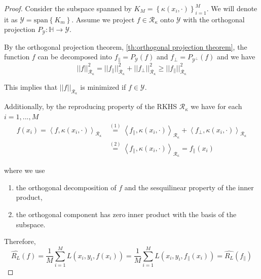 \begin{proof}
    Consider the subspace spanned by $K_M =\left \lbrace \kappa(x_i, \cdot) \right\rbrace_{i = 1}^{M}$. We will denote it as $\mathcal{Y}=\mathrm{span}\left\lbrace K_m \right\rbrace$. Assume we project $f \in \mathcal{R}_{\kappa}$ onto $\mathcal{Y}$ with the orthogonal projection ${P_{\mathcal{Y}}: \mathbb{H} \longrightarrow \mathcal{Y}}$.

    By the orthogonal projection theorem, \autoref{th:orthogonal projection theorem}, the function $f$ can be decomposed into $f_{\parallel} = P_{\mathcal{Y}}(f)$ and $f_{\perp} = P_{\mathcal{Y}^{\perp}}(f)$ and we have 
    \begin{equation}\label{eq:inequality orthogonal projection}
        ||f||_{\mathcal{R}_{\kappa}}^2 = ||f_{\parallel}||_{\mathcal{R}_{\kappa}}^2 + ||f_{\perp}||_{\mathcal{R}_{\kappa}}^2 \geq ||f_{\parallel}||_{\mathcal{R}_{\kappa}}^2
    \end{equation}
    
    This implies that $||f||_{\mathcal{R}_{\kappa}}$ is minimized if $f \in \mathcal{Y}$.

    Additionally, by the reproducing property of the RKHS $\mathcal{R}_{\kappa}$ we have for each $i=1,...,M$
    \begin{align}
        f(x_i)=\left< f, \kappa(x_i, \cdot) \right>_{\mathcal{R}_{\kappa}} &\stackrel{(1)}{=} \left< f_{\parallel}, \kappa(x_i, \cdot) \right>_{\mathcal{R}_{\kappa}} + \left< f_{\perp}, \kappa(x_i, \cdot) \right>_{\mathcal{R}_{\kappa}} \\
        &\stackrel{(2)}{=} \left< f_{\parallel}, \kappa(x_i, \cdot) \right>_{\mathcal{R}_{\kappa}} = f_{\parallel}(x_i)
    \end{align}

    where we use
    \begin{enumerate}
        \item the orthogonal decomposition of $f$ and the sesquilinear property of the inner product,
        \item the orthogonal component has zero inner product with the basis of the subspace.
    \end{enumerate}

    Therefore, 
    \begin{equation} 
        \hat{R_L}(f) = \frac{1}{M}\sum_{i=1}^M L(x_i, y_i, f(x_i)) =\frac{1}{M}\sum_{i=1}^M L(x_i, y_i, f_{\parallel}(x_i)) = \hat{R_L}(f_{\parallel}) \label{eq:R_L f and fparallel} 
    \end{equation}


\end{proof}
